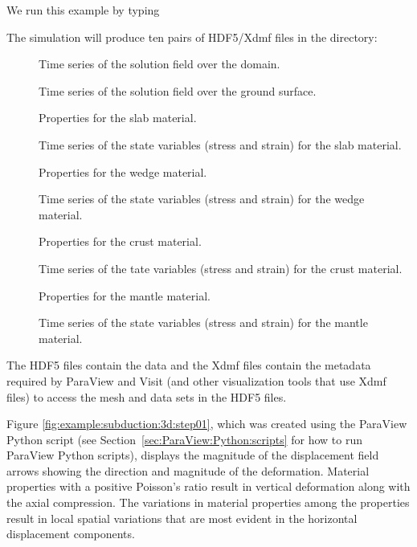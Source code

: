 We run this example by typing
The simulation will produce ten pairs of HDF5/Xdmf files in the
 directory:
\begin{description}
\item[] Time series of the solution field over the domain.
\item[] Time series of the solution field over the ground surface.
\item[] Properties for
  the slab material.
\item[] Time series of the state variables (stress and strain) for the slab material.
\item[] Properties for
  the wedge material.
\item[] Time series of the state variables (stress and strain) for the wedge material.
\item[] Properties for
  the crust material.
\item[] Time series of the tate variables
  (stress and strain) for the crust material.
\item[] Properties for
  the mantle material.
\item[] Time series of the state variables
  (stress and strain) for the mantle material.
\end{description}
The HDF5 files contain the data and the Xdmf files contain the
metadata required by ParaView and Visit (and other visualization tools
that use Xdmf files) to access the mesh and data sets in the HDF5
files.

Figure \ref{fig:example:subduction:3d:step01}, which was created using
the ParaView Python script  (see
Section~\vref{sec:ParaView:Python:scripts} for how to run ParaView
Python scripts), displays the magnitude of
the displacement field arrows showing the direction and magnitude of
the deformation. Material properties with a positive Poisson's ratio
result in vertical deformation along with the axial compression. The
variations in material properties among the properties result in local
spatial variations that are most evident in the horizontal
displacement components.

